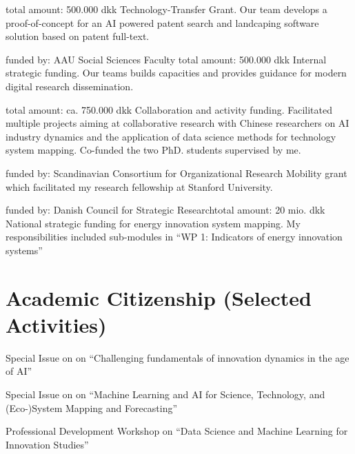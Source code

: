 \documentclass[10pt,a4paper,sans]{moderncv}   %
\begin{document}
 {total amount: 500.000 dkk}
{Technology-Transfer Grant. Our team develops a proof-of-concept for an AI powered patent search and landcaping software solution based on patent full-text.}

 {funded by: AAU Social Sciences Faculty} {total amount: 500.000 dkk}
{Internal strategic funding. Our teams builds capacities and provides guidance for modern digital research dissemination.}

 {total amount: ca. 750.000 dkk} 
{Collaboration and activity funding. Facilitated multiple projects aiming at collaborative research with Chinese researchers on AI industry dynamics and the application of data science methods for technology system mapping. Co-funded the two PhD. students supervised by me.}

 {funded by: Scandinavian Consortium for Organizational Research} {} 
{Mobility grant which facilitated my research fellowship at Stanford University.}

 {funded by: Danish Council for Strategic Research}{total amount: 20 mio. dkk}
{National strategic funding for energy innovation system mapping. My responsibilities included sub-modules in \enquote{WP 1: Indicators of energy innovation systems}}



\section{Academic Citizenship (Selected Activities)}

{Special Issue on on \enquote{Challenging fundamentals of innovation dynamics in the age of AI}}

{Special Issue on on \enquote{Machine Learning and AI for Science, Technology, and (Eco-)System Mapping and Forecasting}}

{Professional Development Workshop on \enquote{Data Science and Machine Learning for Innovation Studies}}
\end{document}
